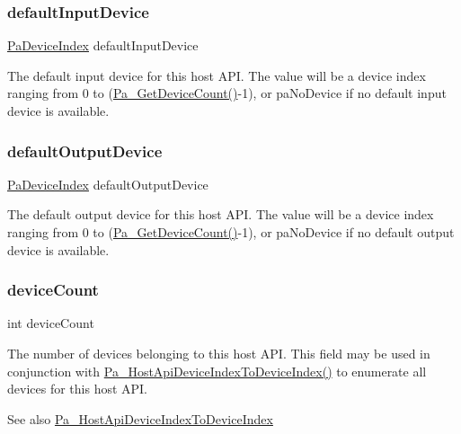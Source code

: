 \subsubsection{\texorpdfstring{default\+Input\+Device}{defaultInputDevice}}
{\footnotesize\ttfamily \hyperlink{portaudio_8h_ad79317e65bde63d76c4b8e711ac5a361}{Pa\+Device\+Index} default\+Input\+Device}

The default input device for this host A\+PI. The value will be a device index ranging from 0 to (\hyperlink{portaudio_8h_acfe4d3c5ec1a343f459981bfa2057f8d}{Pa\+\_\+\+Get\+Device\+Count()}-\/1), or pa\+No\+Device if no default input device is available. \mbox{\label{struct_pa_host_api_info_a9bd363301c00185c3da6e7c325c132e5}} 
\subsubsection{\texorpdfstring{default\+Output\+Device}{defaultOutputDevice}}
{\footnotesize\ttfamily \hyperlink{portaudio_8h_ad79317e65bde63d76c4b8e711ac5a361}{Pa\+Device\+Index} default\+Output\+Device}

The default output device for this host A\+PI. The value will be a device index ranging from 0 to (\hyperlink{portaudio_8h_acfe4d3c5ec1a343f459981bfa2057f8d}{Pa\+\_\+\+Get\+Device\+Count()}-\/1), or pa\+No\+Device if no default output device is available. \mbox{\label{struct_pa_host_api_info_aeae4d6852439dcd029768b91adabc33b}} 
\subsubsection{\texorpdfstring{device\+Count}{deviceCount}}
{\footnotesize\ttfamily int device\+Count}

The number of devices belonging to this host A\+PI. This field may be used in conjunction with \hyperlink{portaudio_8h_a54f306b5e5258323c95a27c5722258cd}{Pa\+\_\+\+Host\+Api\+Device\+Index\+To\+Device\+Index()} to enumerate all devices for this host A\+PI. \begin{DoxySeeAlso}{See also}
\hyperlink{portaudio_8h_a54f306b5e5258323c95a27c5722258cd}{Pa\+\_\+\+Host\+Api\+Device\+Index\+To\+Device\+Index} 
\end{DoxySeeAlso}
\mbox{\label{struct_pa_host_api_info_a8f8f80d37794cde9472343e4487ba3eb}} 
